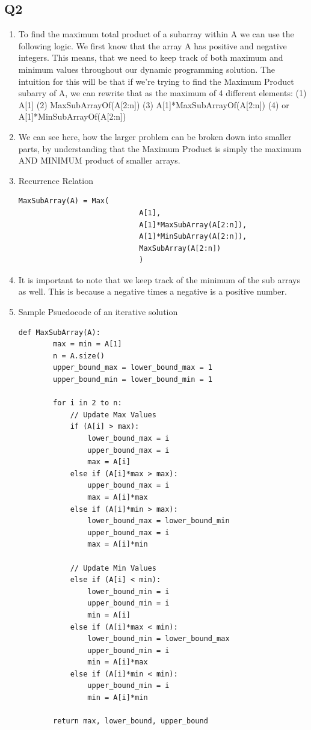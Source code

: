 \documentclass{article}
\begin{document}
\subsection*{Q2}
\begin{enumerate}[label=(\alph*)]
    \item To find the maximum total product of a subarray within A we can use the following logic. We first know that the array A has positive and negative integers. This means, that we need to keep track of both maximum and minimum values throughout our dynamic programming solution. The intuition for this will be that if we're trying to find the Maximum Product subarry of A, we can rewrite that as the maximum of 4 different elements:
    \subitem (1) A[1] 
    \subitem (2) MaxSubArrayOf(A[2:n])
    \subitem (3) A[1]*MaxSubArrayOf(A[2:n])
    \subitem (4) or A[1]*MinSubArrayOf(A[2:n])
    
    \item We can see here, how the larger problem can be broken down into smaller parts, by understanding that the Maximum Product is simply the maximum AND MINIMUM product of smaller arrays.
    \item Recurrence Relation
    \begin{lstlisting}[frame=single]
        MaxSubArray(A) = Max(
                            A[1], 
                            A[1]*MaxSubArray(A[2:n]), 
                            A[1]*MinSubArray(A[2:n]), 
                            MaxSubArray(A[2:n])
                            )
    \end{lstlisting}
    \item It is important to note that we keep track of the minimum of the sub arrays as well. This is because a negative times a negative is a positive number.
    \item Sample Psuedocode of an iterative solution
    \begin{lstlisting}[frame=single]
    def MaxSubArray(A):
        max = min = A[1]
        n = A.size()
        upper_bound_max = lower_bound_max = 1
        upper_bound_min = lower_bound_min = 1
        
        for i in 2 to n:
            // Update Max Values
            if (A[i] > max):
                lower_bound_max = i
                upper_bound_max = i
                max = A[i]
            else if (A[i]*max > max):
                upper_bound_max = i
                max = A[i]*max
            else if (A[i]*min > max):
                lower_bound_max = lower_bound_min
                upper_bound_max = i
                max = A[i]*min

            // Update Min Values
            else if (A[i] < min):
                lower_bound_min = i
                upper_bound_min = i
                min = A[i]
            else if (A[i]*max < min):
                lower_bound_min = lower_bound_max
                upper_bound_min = i
                min = A[i]*max
            else if (A[i]*min < min):
                upper_bound_min = i
                min = A[i]*min

        return max, lower_bound, upper_bound
    \end{lstlisting}
\end{enumerate}
\end{document}
